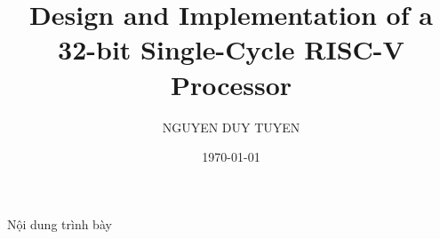 \documentclass[10pt]{beamer}
\title[RISC-V Single-Cycle]{Design and Implementation of a \\ 32-bit Single-Cycle RISC-V Processor}
\author{NGUYEN DUY TUYEN}
\institute{GROUP 5}
\date{\today}
\begin{document}
	
	\begin{frame}
		\titlepage
	\end{frame}
	
	\begin{frame}{Nội dung trình bày}
		\tableofcontents
	\end{frame}
	
	
	
\end{document}

